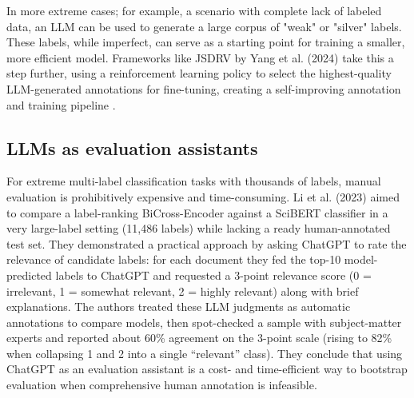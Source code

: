 In more extreme cases; for example, a scenario with complete lack of labeled data, an LLM can be used to generate a large corpus of "weak" or "silver" labels. These labels, while imperfect, can serve as a starting point for training a smaller, more efficient model. Frameworks like JSDRV by Yang et al. (2024) take this a step further, using a reinforcement learning policy to select the highest-quality LLM-generated annotations for fine-tuning, creating a self-improving annotation and training pipeline \cite{yang-etal-2024-reinforcement}.

\subsection{LLMs as evaluation assistants}
For extreme multi-label classification tasks with thousands of labels, manual evaluation is prohibitively expensive and time-consuming. Li et al. (2023) aimed to compare a label-ranking BiCross-Encoder against a SciBERT classifier in a very large-label setting (11,486 labels) while lacking a ready human-annotated test set. They demonstrated a practical approach by asking ChatGPT to rate the relevance of candidate labels: for each document they fed the top-10 model-predicted labels to ChatGPT and requested a 3-point relevance score (0 = irrelevant, 1 = somewhat relevant, 2 = highly relevant) along with brief explanations. The authors treated these LLM judgments as automatic annotations to compare models, then spot-checked a sample with subject-matter experts and reported about 60\% agreement on the 3-point scale (rising to 82\% when collapsing 1 and 2 into a single ``relevant'' class). They conclude that using ChatGPT as an evaluation assistant is a cost- and time-efficient way to bootstrap evaluation when comprehensive human annotation is infeasible. \cite{li-etal-2023-enhancing-extreme}


